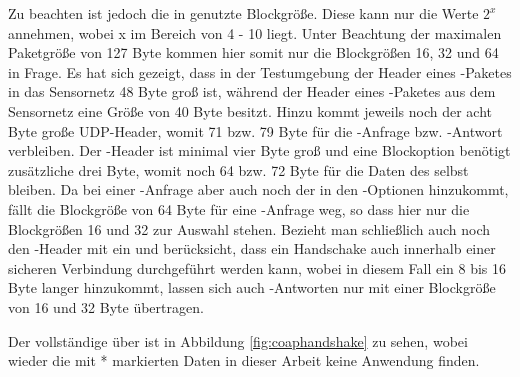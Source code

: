 Zu beachten ist jedoch die in  genutzte Blockgröße. Diese kann nur die Werte $ 2^x $ annehmen, wobei x im Bereich von 4 - 10 liegt.
Unter Beachtung der maximalen Paketgröße von 127 Byte kommen hier somit nur die Blockgrößen 16, 32 und 64 in Frage. Es hat sich gezeigt,
dass in der Testumgebung der Header eines -Paketes in das Sensornetz 48 Byte groß ist, während der Header eines -Paketes
aus dem Sensornetz eine Größe von 40 Byte besitzt. Hinzu kommt jeweils noch der acht Byte große UDP-Header, womit 71 bzw. 79 Byte für die -Anfrage bzw.
-Antwort verbleiben. Der -Header ist minimal vier Byte groß und eine Blockoption benötigt zusätzliche drei Byte, womit noch 64 bzw. 72 Byte
für die Daten des  selbst bleiben. Da bei einer -Anfrage aber auch noch der  in den -Optionen hinzukommt,
fällt die Blockgröße von 64 Byte für eine -Anfrage weg, so dass hier nur die Blockgrößen 16 und 32 zur Auswahl stehen. Bezieht man schließlich
auch noch den -Header mit ein und berücksicht, dass ein Handschake auch innerhalb einer sicheren Verbindung durchgeführt werden kann, wobei
in diesem Fall ein 8 bis 16 Byte langer  hinzukommt, lassen sich auch -Antworten nur mit einer Blockgröße von 16 und 32 Byte übertragen.

Der vollständige  über  ist in Abbildung \ref{fig:coaphandshake} zu sehen, wobei wieder die mit * markierten Daten
in dieser Arbeit keine Anwendung finden.

